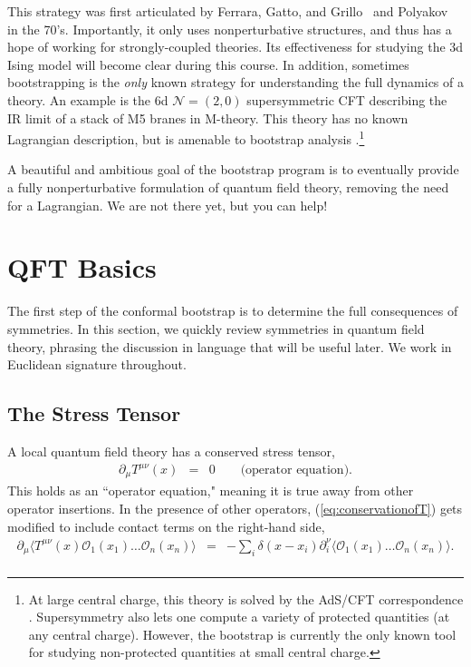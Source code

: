 \documentclass[11pt]{ws-rv9x6}
\newcommand\be{\begin{eqnarray}}
\newcommand\ee{\end{eqnarray}}
\newcommand\cO{\mathcal{O}}
\newcommand\ptl\partial
\newcommand\<\langle
\renewcommand\>\rangle
\newcommand\de\delta
\newcommand\nn{\nonumber}
\renewcommand\.{\cdot}
\begin{document}
This strategy was first articulated by Ferrara, Gatto, and Grillo~\cite{Ferrara:1973yt} and Polyakov~\cite{Polyakov:1974gs} in the 70's.  Importantly, it only uses nonperturbative structures, and thus has a hope of working for strongly-coupled theories.  Its effectiveness for studying the 3d Ising model will become clear during this course.  In addition, sometimes bootstrapping is the {\it only\/} known strategy for understanding the full dynamics of a theory. An example is the 6d $\mathcal{N}=(2,0)$ supersymmetric CFT describing the IR limit of a stack of M5 branes in M-theory.  This theory has no known Lagrangian description, but is amenable to bootstrap analysis \cite{Beem:2015aoa}.\footnote{At large central charge, this theory is solved by the AdS/CFT correspondence \cite{Maldacena:1997re}. Supersymmetry also lets one compute a variety of protected quantities (at any central charge).  However, the bootstrap is currently the only known tool for studying non-protected quantities at small central charge.}

A beautiful and ambitious goal of the bootstrap program is to eventually provide a fully nonperturbative  formulation of quantum field theory, removing the need for a Lagrangian.  We are not there yet, but you can help!


\section{QFT Basics}

The first step of the conformal bootstrap is to determine the full consequences of symmetries.  In this section, we quickly review symmetries in quantum field theory, phrasing the discussion in language that will be useful later.  We work in Euclidean signature throughout.

\subsection{The Stress Tensor}

A local quantum field theory has a conserved stress tensor,
\be
\label{eq:conservationofT}
\ptl_\mu T^{\mu\nu}(x) &=& 0 \qquad \textrm{(operator equation)}.
\ee
This holds as an ``operator equation," meaning it is true away from other operator insertions.  In the presence of other operators, (\ref{eq:conservationofT}) gets modified to include contact terms on the right-hand side,
\be
\label{eq:wardidentity}
\partial_\mu \< T^{\mu\nu}(x) \cO_1(x_1)\dots \cO_n(x_n)\> &=& -\sum_i \de(x-x_i)\ptl_i^\nu\<\cO_1(x_1)\dots \cO_n(x_n)\>.\nn\\
\ee
\end{document}
